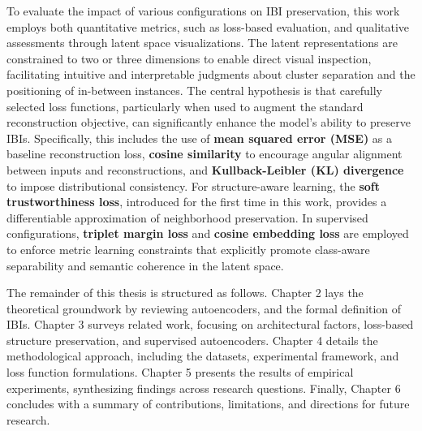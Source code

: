 To evaluate the impact of various configurations on IBI preservation, this work employs both quantitative metrics, such as loss-based evaluation, and qualitative assessments through latent space visualizations. The latent representations are constrained to two or three dimensions to enable direct visual inspection, facilitating intuitive and interpretable judgments about cluster separation and the positioning of in-between instances. The central hypothesis is that carefully selected loss functions, particularly when used to augment the standard reconstruction objective, can significantly enhance the model's ability to preserve IBIs. Specifically, this includes the use of \textbf{mean squared error (MSE)} as a baseline reconstruction loss, \textbf{cosine similarity} to encourage angular alignment between inputs and reconstructions, and \textbf{Kullback-Leibler (KL) divergence} to impose distributional consistency. For structure-aware learning, the \textbf{soft trustworthiness loss}, introduced for the first time in this work, provides a differentiable approximation of neighborhood preservation. In supervised configurations, \textbf{triplet margin loss} and \textbf{cosine embedding loss} are employed to enforce metric learning constraints that explicitly promote class-aware separability and semantic coherence in the latent space.
    
The remainder of this thesis is structured as follows. Chapter 2 lays the theoretical groundwork by reviewing autoencoders, and the formal definition of IBIs. Chapter 3 surveys related work, focusing on architectural factors, loss-based structure preservation, and supervised autoencoders. Chapter 4 details the methodological approach, including the datasets, experimental framework, and loss function formulations. Chapter 5 presents the results of empirical experiments, synthesizing findings across research questions. Finally, Chapter 6 concludes with a summary of contributions, limitations, and directions for future research.
